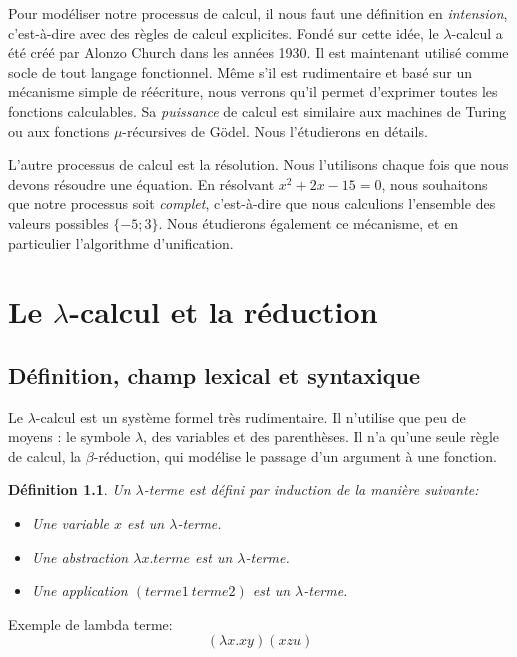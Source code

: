 \documentclass[11pt]{book}
\newtheorem{definition}{Définition}
\begin{document}
Pour modéliser notre processus de calcul, il nous faut une définition en \textit{intension}, 
c'est-à-dire avec des règles de calcul explicites. Fondé sur
cette idée, le $\lambda$-calcul a été créé par Alonzo Church dans les années 1930.
Il est maintenant utilisé comme socle de tout langage fonctionnel. 
Même s'il est  rudimentaire et basé sur un mécanisme simple de réécriture,
nous verrons qu'il permet d'exprimer toutes les fonctions calculables. Sa \textit{puissance}
de calcul est similaire aux machines de Turing ou aux fonctions $\mu$-récursives de Gödel.
Nous l'étudierons en détails.


\vspace{0.3cm}
L'autre processus de calcul est la résolution. Nous l'utilisons chaque fois que nous devons résoudre
une équation. En résolvant $x^2+2x-15=0$, nous souhaitons que notre processus 
soit \textit{complet}, c'est-à-dire que nous calculions 
l'ensemble des valeurs possibles $\{-5; 3\}$.
 Nous étudierons également  ce mécanisme, et en particulier l'algorithme d'unification.


\chapter{Le $\lambda$-calcul et la réduction}

\section{Définition, champ lexical et syntaxique}
Le $\lambda$-calcul est un système formel très rudimentaire. Il n'utilise que  
peu de moyens : le symbole $\lambda$, des variables et des parenthèses. Il n'a
qu'une seule règle de calcul, la $\beta$-réduction, qui modélise le passage d'un
argument à une fonction.


\begin{definition}
Un $\lambda $-terme est défini par induction de la manière suivante:
\begin{itemize}
  \item Une  variable $x$ est un $\lambda$-terme.
  \item Une abstraction $\lambda x.terme$ est un $\lambda$-terme.
  \item Une application $(terme1 \ terme2)$ est un $\lambda$-terme.
\end{itemize}
\end{definition}

Exemple de lambda terme:
$$ ( \lambda x. xy ) (x z u)  $$
\end{document}
